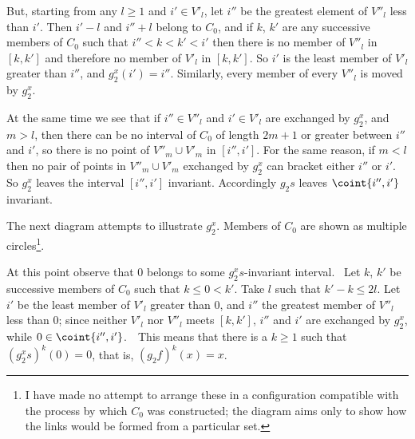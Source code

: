 {But, starting from any $l\ge 1$ and $i'\in V'_l$,
let $i''$ be the greatest element of $V''_l$ less than $i'$.   Then
$i'-l$ and $i''+l$ belong to $C_0$, and if $k$, $k'$ are any successive
members of $C_0$ such that $i''<k<k'<i'$ then there is no member of
$V''_l$ in $[k,k']$ and therefore no member of $V'_l$ in $[k,k']$.   So
$i'$ is the least member of $V'_l$ greater than $i''$, and
$g_2^x(i')=i''$.   Similarly, every member of every $V''_l$ is moved by
$g_2^x$.

At the same time we see that if $i''\in V''_l$ and
$i'\in V'_l$ are exchanged by $g_2^x$, and $m>l$, then there can be no
interval of $C_0$ of length $2m+1$ or greater between $i''$ and $i'$, so
there is no point of $V''_m\cup V'_m$ in $[i'',i']$.   For the same
reason, if $m<l$ then no pair of points in $V''_m\cup V'_m$ exchanged by
$g_2^x$ can bracket either $i''$ or $i'$.
So $g_2^x$ leaves the interval $[i'',i']$ invariant.   Accordingly
$g_2s$ leaves $\coint{i'',i'}$ invariant.

The next diagram attempts to illustrate $g_2^x$.   Members of $C_0$ are
shown as multiple circles\footnote{I have made no attempt to arrange
these in a configuration compatible with the process by which $C_0$ was
constructed;  the diagram aims only to show how the links would be
formed from a particular set.}.


\vskip20pt

\def\Caption{Pairs of points exchanged by $g_2^x$}

At this point observe that $0$ belongs to some $g_2^xs$-invariant
interval.   \Prf\ Let $k$, $k'$ be successive members of $C_0$
such that $k\le 0<k'$.   Take $l$ such that $k'-k\le 2l$.   Let $i'$ be
the least member of $V'_l$ greater than $0$, and $i''$ the greatest
member of $V''_l$ less than $0$;  since neither $V'_l$ nor $V''_l$ meets
$[k,k']$, $i''$ and $i'$ are exchanged by $g_2^x$, while
$0\in\coint{i'',i'}$.\ \QeD\
This means that there is a $k\ge 1$ such that $(g_2^xs)^k(0)=0$, that
is, $(g_2f)^k(x)=x$.

\medskip

}
